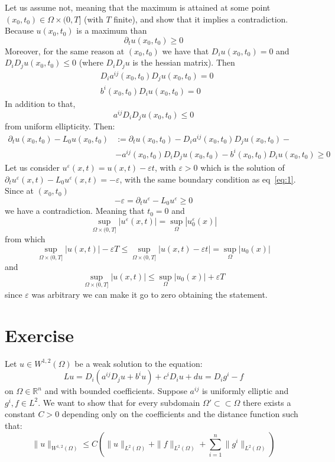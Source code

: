 \documentclass{article}
\newcommand{\R}{\mathbb{R}}
\begin{document}
Let us assume not, meaning that the maximum is attained at some point $(x_0, t_0) \in \Omega \times (0,T]$ (with $T$ finite), and show that it implies a contradiction.\\
Because $u(x_0, t_0)$ is a maximum than 
\[
    \partial_t u(x_0, t_0) \geq 0
\]
Moreover, for the same reason at $(x_0, t_0)$ we have that $D_i u(x_0, t_0) = 0$ and $D_i D_j u(x_0, t_0) \leq 0$ (where $D_i D_j u$ is the hessian matrix). Then
\[
    \begin{split}
        &D_i a^{ij}(x_0,t_0) D_j u(x_0,t_0) = 0\\
        &b^i(x_0,t_0) D_i u(x_0,t_0) = 0
    \end{split}
\]
In addition to that,
\[
    a^{ij} D_i D_j u(x_0,t_0) \leq 0
\]
from uniform ellipticity. Then:
\[
    \begin{split}
        \partial_t u(x_0,t_0) - L_0 u(x_0,t_0) &:= \partial_t u(x_0,t_0) - D_i a^{ij}(x_0,t_0) D_j u(x_0,t_0) -\\
        &- a^{ij}(x_0,t_0) D_i D_j u(x_0,t_0) 
        - b^i(x_0,t_0) D_i u(x_0,t_0) \geq 0
    \end{split}
\]
Let us consider $u^\varepsilon (x,t)=u(x,t) - \varepsilon t$, with $\varepsilon > 0$ which is the solution of $\partial_t u^\varepsilon (x,t) - L_0 u^\varepsilon (x, t) = - \varepsilon$, with the same boundary condition as eq~\eqref{eq:1}. Since at $(x_0, t_0)$
\[
    -\varepsilon = \partial_t u^\varepsilon -L_0 u^\varepsilon \geq 0
\]
we have a contradiction. Meaning that $t_0 = 0$ and
\[
    \sup_{\Omega \times (0,T]} |u^\varepsilon(x,t)| = \sup_{\Omega} |u^\varepsilon_0 (x)|
\]
from which
\[
    \sup_{\Omega \times (0,T]} |u(x,t) |- \varepsilon T \leq \sup_{\Omega \times (0,T]} |u(x,t) - \varepsilon t| = \sup_{\Omega} |u_0 (x)|
\]
and
\[
    \sup_{\Omega \times (0,T]} |u(x,t) | \leq \sup_{\Omega} |u_0 (x)| + \varepsilon T 
\]
since $\varepsilon$ was arbitrary we can make it go to zero obtaining the statement.
\section{Exercise}
Let $u \in W^{1,2}(\Omega)$ be a weak solution to the equation:
\[
    Lu = D_i(a^{ij}D_j u + b^i u) + c^i D_i u + du = D_i g^i - f
\]
on $\Omega \in \R^n$ and with bounded coefficients. Suppose $a^{ij}$ is uniformly elliptic and $g^i, f \in L^2$. We want to show that for every subdomain $\Omega' \subset \subset \Omega$ there exists a constant $C>0$ depending only on the coefficients and the distance function such that:
\[
    \|u\|_{W^{1,2}(\Omega)} \leq C \left( \|u\|_{L^2(\Omega)} + \| f \|_{L^2(\Omega)} + \sum_{i=1}^{n}\|g^i\|_{L^2(\Omega)} \right)
\]
\end{document}
